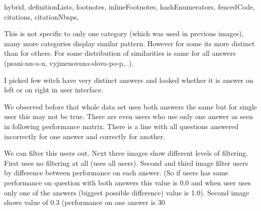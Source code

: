 \documentclass[
  digital, %
  table,   %
  nolof,     %
  nolot,     %
  nocover
]{fithesis3}
\begin{document}
\begin{markdown*}{%
  hybrid,
  definitionLists,
  footnotes,
  inlineFootnotes,
  hashEnumerators,
  fencedCode,
  citations,
  citationNbsps,
}

This is not specific to only one category (which was used in previous images), many more categories display similar pattern. However for some its more distinct than for others. For some distribution of similarities is same for all answers (psani-nn-a-n, vyjmenovana-slova-po-p,..).

I picked few witch have very distinct answers and looked whether it is answer on left or on right in user interface.




We observed before that whole data set uses both answers the same but for single user this may not be true. There are even users who use only one answer as seen in following performance matrix. There is a line with all questions answered incorrectly for one answer and correctly for another.


We can filter this users out. Next three images show different levels of filtering. First uses no filtering at all (uses all users). Second and third image filter users by difference between performance on each answer. (So if users has same performance on question with both answers this value is 0.0 and when user uses only one of the answers (biggest possible difference) value is 1.0). Second image shows value of 0.3 (performance on one answer is 30%


\end{markdown*}
\end{document}
